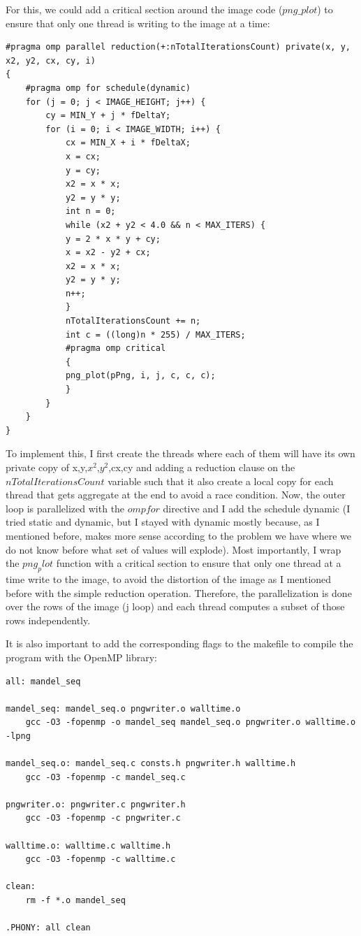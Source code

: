 \documentclass[unicode,11pt,a4paper,oneside,numbers=endperiod,openany]{scrartcl}
\begin{document}
For this, we could add a critical section around the image 
code ($png\_plot$) to ensure that only one thread is writing to the image at a time:

\begin{lstlisting}
#pragma omp parallel reduction(+:nTotalIterationsCount) private(x, y, x2, y2, cx, cy, i)
{
    #pragma omp for schedule(dynamic)
    for (j = 0; j < IMAGE_HEIGHT; j++) {
        cy = MIN_Y + j * fDeltaY;
        for (i = 0; i < IMAGE_WIDTH; i++) {
            cx = MIN_X + i * fDeltaX;
            x = cx;
            y = cy;
            x2 = x * x;
            y2 = y * y;
            int n = 0;
            while (x2 + y2 < 4.0 && n < MAX_ITERS) { 
            y = 2 * x * y + cy;
            x = x2 - y2 + cx;
            x2 = x * x;
            y2 = y * y;
            n++;
            }
            nTotalIterationsCount += n;
            int c = ((long)n * 255) / MAX_ITERS;
            #pragma omp critical
            {
            png_plot(pPng, i, j, c, c, c);
            }
        }
    }
}
\end{lstlisting}

To implement this, I first create the threads where each of them will have its own private copy of x,y,$x^2$,$y^2$,cx,cy and adding a reduction 
clause on the $nTotalIterationsCount$ variable such that it also create a local copy for each thread that gets aggregate at the end to avoid 
a race condition. Now, the outer loop is parallelized with the $omp for$ directive and I add the schedule dynamic (I tried static and dynamic, but I stayed with dynamic mostly 
because, as I mentioned before, makes more sense according to the problem we have where we do not know before what set of values will explode).
Most importantly, I wrap the $png_plot$ function with a critical section to ensure that only one thread at a time write to the image, to avoid 
the distortion of the image as I mentioned before with the simple reduction operation. Therefore, the parallelization is done over the rows of the image
(j loop) and each thread computes a subset of those rows independently. 

It is also important to add the corresponding flags to the makefile to compile the program with the OpenMP library:

\begin{lstlisting}
all: mandel_seq

mandel_seq: mandel_seq.o pngwriter.o walltime.o
    gcc -O3 -fopenmp -o mandel_seq mandel_seq.o pngwriter.o walltime.o -lpng

mandel_seq.o: mandel_seq.c consts.h pngwriter.h walltime.h
    gcc -O3 -fopenmp -c mandel_seq.c

pngwriter.o: pngwriter.c pngwriter.h
    gcc -O3 -fopenmp -c pngwriter.c

walltime.o: walltime.c walltime.h
    gcc -O3 -fopenmp -c walltime.c

clean:
    rm -f *.o mandel_seq

.PHONY: all clean
\end{lstlisting}
\end{document}
